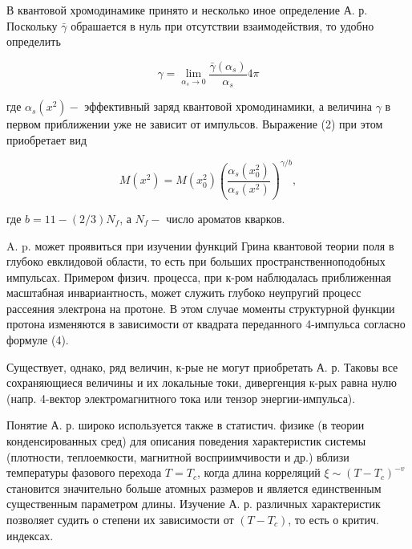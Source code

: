 \documentclass[10pt]{article}
\begin{document}
В квантовой хромодинамике принято и несколько иное определение А. р. Поскольку $\bar{\gamma}$ обрашается в нуль при отсутствии взаимодействия, то удобно определить



\[

\gamma=\lim _{\alpha_{s} \rightarrow 0} \frac{\bar{\gamma}\left(\alpha_{s}\right)}{\alpha_{s}} 4 \pi

\]



где $\alpha_{s}\left(x^{2}\right)-$ эффективный заряд квантовой хромодинамики, а величина $\gamma$ в первом приближении уже не зависит от импульсов. Выражение (2) при этом приобретает вид



\[

M\left(x^{2}\right)=M\left(x_{0}^{2}\right)\left(\frac{\alpha_{s}\left(x_{0}^{2}\right)}{\alpha_{s}\left(x^{2}\right)}\right)^{\gamma / b},

\]



где $b=11-(2 / 3) N_{f}$, а $N_{f}-$ число ароматов кварков.



A. p. может проявиться при изучении функций Грина квантовой теории поля в глубоко евклидовой области, то есть при больших пространственноподобных импульсах. Примером физич. процесса, при к-ром наблюдалась приближенная масштабная инвариантность, может служить глубоко неупругий процесс рассеяния электрона на протоне. В этом случае моменты структурной функции протона изменяются в зависимости от квадрата переданного 4-импульса согласно формуле (4).



Существует, однако, ряд величин, к-рые не могут приобретать А. р. Таковы все сохраняющиеся величины и их локальные токи, дивергенция к-рых равна нулю (напр. 4-вектор электромагнитного тока или тензор энергии-импульса).



Понятие А. р. широко используется также в статистич. физике (в теории конденсированных сред) для описания поведения характеристик системы (плотности, теплоемкости, магнитной восприимчивости и др.) вблизи температуры фазового перехода $T=T_{c}$, когда длина корреляций $\xi \sim\left(T-T_{c}\right)^{-v}$ становится значительно больше атомных размеров и является единственным существенным параметром длины. Изучение А. р. различных характеристик позволяет судить о степени их зависимости от $\left(T-T_{c}\right)$, то есть о критич. индексах.
\end{document}
